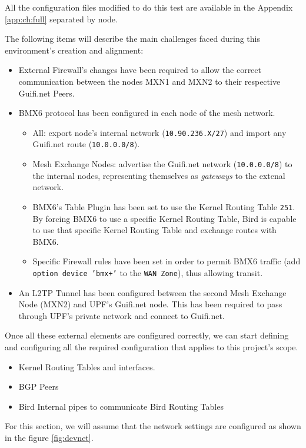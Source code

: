 All the configuration files modified to do this test are available in the Appendix \ref{app:ch:full} separated by node.

The following items will describe the main challenges faced during this environment's creation and alignment:
\begin{itemize}
    \item External Firewall's changes have been required to allow the correct communication between the nodes MXN1 and MXN2  to their respective Guifi.net Peers.
    \item BMX6 protocol has been configured in each node of the mesh network.
        \begin{itemize}
            \item All: export node's internal network (\texttt{10.90.236.X/27}) and import any Guifi.net route (\texttt{10.0.0.0/8}).
            \item Mesh Exchange Nodes: advertise the Guifi.net network (\texttt{10.0.0.0/8}) to the internal nodes, representing themselves as \textit{gateways} to the extenal network.
            \item BMX6's Table Plugin has been set to use the Kernel Routing Table \texttt{251}. By forcing BMX6 to use a specific Kernel Routing Table, Bird is capable to use that specific Kernel Routing Table and exchange routes with BMX6.
            \item Specific Firewall rules have been set in order to permit BMX6 traffic (add \texttt{option device 'bmx+'} to the \texttt{WAN Zone}), thus allowing transit.
        \end{itemize}
     \item An L2TP Tunnel has been configured between the second Mesh Exchange Node (MXN2) and UPF's Guifi.net node. This has been required to pass through UPF's private network and connect to Guifi.net.
\end{itemize}

Once all these external elements are configured correctly, we can start defining and configuring all the required configuration that applies to this project's scope.
\begin{itemize}
    \item Kernel Routing Tables and interfaces.
    \item BGP Peers
    \item Bird Internal pipes to communicate Bird Routing Tables
\end{itemize}
For this section, we will assume that the network settings are configured as shown in the figure \ref{fig:devnet}.


